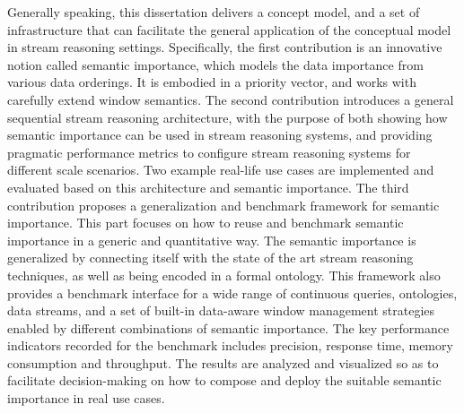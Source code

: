 Generally speaking, this dissertation delivers a concept model, and a set of infrastructure that can facilitate the general application of the conceptual model in stream reasoning settings. 
Specifically, the first contribution is an innovative notion called semantic importance, which models the data importance from various data orderings.
It is embodied in a priority vector, and works with carefully extend window semantics. 
The second contribution introduces a general sequential stream reasoning architecture, with the purpose of both showing how semantic importance can be used in stream reasoning systems, and providing pragmatic performance metrics to configure stream reasoning systems for different scale scenarios. 
Two example real-life use cases are implemented and evaluated based on this architecture and semantic importance. 
The third contribution proposes a generalization and benchmark framework for semantic importance. 
This part focuses on how to reuse and benchmark semantic importance in a generic and quantitative way.
The semantic importance is generalized by connecting itself with the state of the art stream reasoning techniques, as well as being encoded in a formal ontology. 
This framework also provides a benchmark interface for a wide range of continuous queries, ontologies, data streams, and a set of built-in data-aware window management strategies enabled by different combinations of semantic importance. 
The key performance indicators recorded for the benchmark includes precision, response time, memory consumption and throughput. 
The results are analyzed and visualized so as to facilitate decision-making on how to compose and deploy the suitable semantic importance in real use cases. 


